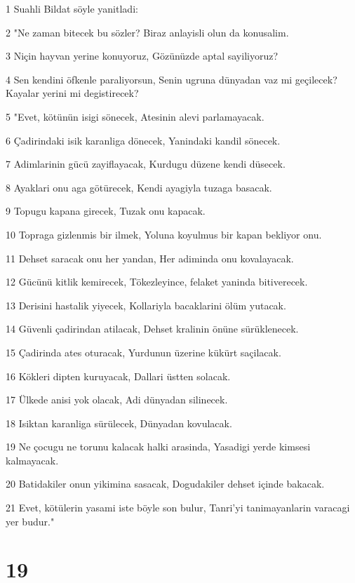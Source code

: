 \par 1 Suahli Bildat söyle yanitladi:
\par 2 "Ne zaman bitecek bu sözler? Biraz anlayisli olun da konusalim.
\par 3 Niçin hayvan yerine konuyoruz, Gözünüzde aptal sayiliyoruz?
\par 4 Sen kendini öfkenle paraliyorsun, Senin ugruna dünyadan vaz mi geçilecek? Kayalar yerini mi degistirecek?
\par 5 "Evet, kötünün isigi sönecek, Atesinin alevi parlamayacak.
\par 6 Çadirindaki isik karanliga dönecek, Yanindaki kandil sönecek.
\par 7 Adimlarinin gücü zayiflayacak, Kurdugu düzene kendi düsecek.
\par 8 Ayaklari onu aga götürecek, Kendi ayagiyla tuzaga basacak.
\par 9 Topugu kapana girecek, Tuzak onu kapacak.
\par 10 Topraga gizlenmis bir ilmek, Yoluna koyulmus bir kapan bekliyor onu.
\par 11 Dehset saracak onu her yandan, Her adiminda onu kovalayacak.
\par 12 Gücünü kitlik kemirecek, Tökezleyince, felaket yaninda bitiverecek.
\par 13 Derisini hastalik yiyecek, Kollariyla bacaklarini ölüm yutacak.
\par 14 Güvenli çadirindan atilacak, Dehset kralinin önüne sürüklenecek.
\par 15 Çadirinda ates oturacak, Yurdunun üzerine kükürt saçilacak.
\par 16 Kökleri dipten kuruyacak, Dallari üstten solacak.
\par 17 Ülkede anisi yok olacak, Adi dünyadan silinecek.
\par 18 Isiktan karanliga sürülecek, Dünyadan kovulacak.
\par 19 Ne çocugu ne torunu kalacak halki arasinda, Yasadigi yerde kimsesi kalmayacak.
\par 20 Batidakiler onun yikimina sasacak, Dogudakiler dehset içinde bakacak.
\par 21 Evet, kötülerin yasami iste böyle son bulur, Tanri'yi tanimayanlarin varacagi yer budur."

\chapter{19}

